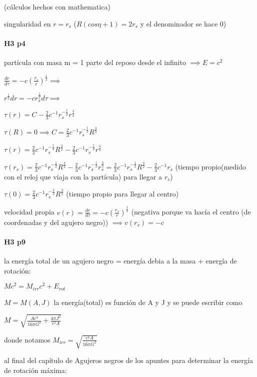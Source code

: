 \documentclass[12pt]{book}
\begin{document}
(cálculos hechos con mathematica)

singularidad en $r=r_s$ ($R(cos \eta +1) = 2 r_s$ y el denominador se hace 0)

\paragraph{H3 p4}

partícula con masa m = 1 parte del reposo desde el infinito $\implies E = c^2$ 

$\frac{dr}{d\tau} = -c (\frac{r_s}{r})^{\frac{1}{2}} \implies$

$r^{\frac{1}{2}} dr = -c r_s^{\frac{1}{2}} d\tau \implies$

$\tau(r) = C -\frac{2}{3}c^{-1}r_s^{-\frac{1}{2}} r^{\frac{3}{2}} $

$\tau(R) = 0 \implies C =  \frac{2}{3}c^{-1}r_s^{-\frac{1}{2}} R^{\frac{3}{2}} $

$\tau(r) = \frac{2}{3}c^{-1}r_s^{-\frac{1}{2}} R^{\frac{3}{2}}  -\frac{2}{3}c^{-1}r_s^{-\frac{1}{2}} r^{\frac{3}{2}} $

$\tau(r_s) = \frac{2}{3}c^{-1}r_s^{-\frac{1}{2}} R^{\frac{3}{2}}  -\frac{2}{3}c^{-1}r_s^{-\frac{1}{2}} r_s^{\frac{3}{2}} = \frac{2}{3}c^{-1}r_s^{-\frac{1}{2}} R^{\frac{3}{2}}  -\frac{2}{3}c^{-1}r_s$  (tiempo propio(medido con el reloj que viaja con la partícula) para llegar a $r_s$)


$\tau(0) = \frac{2}{3}c^{-1}r_s^{-\frac{1}{2}} R^{\frac{3}{2}}$ (tiempo propio para llegar al centro)

velocidad propia $v(r) = \frac{dr}{d\tau} = -c (\frac{r_s}{r})^{\frac{1}{2}} $ (negativa porque va hacía el centro (de coordenadas y del agujero negro)) $\implies v(r_s) = -c$


\paragraph{H3 p9}

la energía total de un agujero negro = energía debia a la masa + energía de rotación:

$M c^2 = M_{irr} c^2 + E_{rot}$

$M = M(A,J) $ la energía(total) es función de A y J y se puede escribir como

$M = \sqrt{\frac{A c^4}{16 \pi G^2} + \frac{4 \pi J^2}{c^2 A} }$

donde notamos  $M_{irr} = \sqrt{\frac{c^4 A}{16 \pi G^2}}$

al final del capítulo de Agujeros negros de los apuntes para determinar la energía de rotación máxima:
\end{document}
